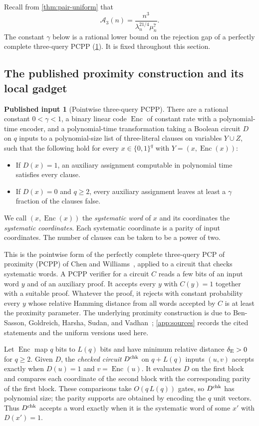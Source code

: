 \documentclass[11pt,letterpaper]{article}
\theoremstyle{definition}
\newtheorem{import}[theorem]{Published input}
\theoremstyle{remark}
\begin{document}
Recall from \cref{thm:pair-uniform} that
\[
 \mathcal A_3(n)=\frac{n^3}{\lambda_n^{21/4}\mu_n^7}.
\]
The constant $\gamma$ below is a rational lower bound on the rejection
gap of a perfectly complete three-query PCPP (\cref{imp:three-pcpp}). It
is fixed throughout this section.

\subsection{The published proximity construction and its local gadget}

\begin{import}[Pointwise three-query PCPP]\label{imp:three-pcpp}
There are a rational constant $0<\gamma<1$, a binary linear code
$\operatorname{Enc}$ of constant rate with a polynomial-time encoder,
and a polynomial-time transformation taking a Boolean circuit $D$ on
$q$ inputs to a polynomial-size list of three-literal clauses on
variables $Y\cup Z$, such that the following hold for every
$x\in\{0,1\}^q$ with $Y=(x,\operatorname{Enc}(x))$:
\begin{itemize}
\item If $D(x)=1$, an auxiliary assignment computable in polynomial
time satisfies every clause.
\item If $D(x)=0$ and $q\ge2$, every auxiliary assignment leaves at
least a $\gamma$ fraction of the clauses false.
\end{itemize}
We call $(x,\operatorname{Enc}(x))$ the \emph{systematic word} of $x$
and its coordinates the \emph{systematic coordinates}. Each systematic
coordinate is a parity of input coordinates. The number of clauses can
be taken to be a power of two.
\end{import}

This is the pointwise form of the perfectly complete three-query PCP of
proximity (PCPP) of Chen and Williams~\cite[Lemma~24]{CW19}, applied to
a circuit that checks systematic words. A PCPP verifier for a circuit
$C$ reads a few bits of an input word $y$ and of an auxiliary proof. It
accepts every $y$ with $C(y)=1$ together with a suitable proof. Whatever
the proof, it rejects with constant probability every $y$ whose relative
Hamming distance from all words accepted by $C$ is at least the
proximity parameter. The underlying proximity construction is due to
Ben-Sasson, Goldreich, Harsha, Sudan, and Vadhan~\cite{BGHSV06};
\cref{app:sources} records the cited statements and the uniform
versions used here.

Let $\operatorname{Enc}$ map $q$ bits to $L(q)$ bits and have minimum
relative distance $\delta_{\rm E}>0$ for $q\ge2$. Given $D$, the
\emph{checked circuit} $D^{\rm chk}$ on $q+L(q)$ inputs $(u,v)$ accepts
exactly when $D(u)=1$ and $v=\operatorname{Enc}(u)$. It evaluates $D$
on the first block and compares each coordinate of the second block
with the corresponding parity of the first block. These comparisons
take $O(q\,L(q))$ gates, so $D^{\rm chk}$ has polynomial size; the
parity supports are obtained by encoding the $q$ unit vectors. Thus
$D^{\rm chk}$ accepts a word exactly when it is the systematic word of
some $x'$ with $D(x')=1$.
\end{document}
